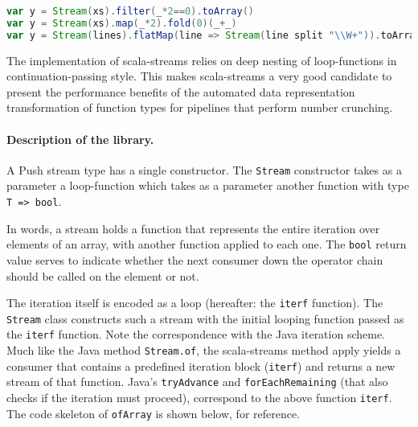 \begin{lstlisting}[language=Scala, caption=Example uses of scala-streams.]
var y = Stream(xs).filter(_*2==0).toArray()
var y = Stream(xs).map(_*2).fold(0)(_+_)
var y = Stream(lines).flatMap(line => Stream(line split "\\W+")).toArray
\end{lstlisting}

The implementation of scala-streams relies on deep nesting of loop-functions in
continuation-passing style. This makes scala-streams a very good candidate to
present the performance benefits of the automated data representation
transformation of function types for pipelines that perform number crunching.

\paragraph{Description of the library. }
A Push stream type has a single constructor. The \verb|Stream| constructor takes
as a parameter a loop-function which takes as a parameter another function with
type \verb|T => bool|.

In words, a stream holds a function that represents the entire iteration over
elements of an array, with another function applied to each one.  The
\verb|bool| return value serves to indicate whether the next consumer down the
operator chain should be called on the element or not.

The iteration itself is encoded as a loop (hereafter: the \verb|iterf|
function). The \verb|Stream| class constructs such a stream with the initial
looping function passed as the \verb|iterf| function. Note the correspondence
with the Java iteration scheme. Much like the Java method \verb|Stream.of|, the
scala-streams method apply yields a consumer that contains a predefined
iteration block (\verb|iterf|) and returns a new stream of that function. Java's
\verb|tryAdvance| and \verb|forEachRemaining| (that also checks if the iteration
must proceed), correspond to the above function \verb|iterf|. The code skeleton
of \verb|ofArray| is shown below, for reference.

